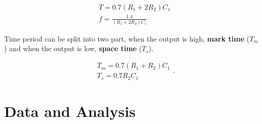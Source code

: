 \documentclass[12pt]{article}
\begin{document}
\begin{equation*}
	\begin{split}
		&T = 0.7 (R_1 + 2 R_2) C_1 \\
		&f = \frac{1.4}{(R_1 + 2 R_2) C_1}
	\end{split}
	\end{equation*}

Time period can be split into two part, when the output is high, \textbf{mark time} ($T_m$) and when the output is low,  \textbf{space time} ($T_s$).

\begin{equation*}
	\begin{split}
		&T_m = 0.7 (R_1 + R_2) C_1 \\
		&T_s = 0.7 R_2 C_1
	\end{split}.
\end{equation*}


\section{Data and Analysis}
\end{document}

